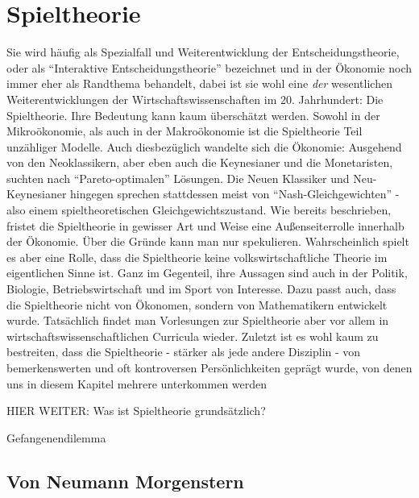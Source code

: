 %
%
%

\chapter{Spieltheorie} \label{cha: Spieltheorie}
\label{Spieltheorie}

Sie wird häufig als Spezialfall und Weiterentwicklung der Entscheidungstheorie, oder als "`Interaktive Entscheidungstheorie"' bezeichnet und in der Ökonomie noch immer eher als Randthema behandelt, dabei ist sie wohl eine \textit{der} wesentlichen Weiterentwicklungen der Wirtschaftswissenschaften im 20. Jahrhundert: Die Spieltheorie. Ihre Bedeutung kann kaum überschätzt werden. Sowohl in der Mikroökonomie, als auch in der Makroökonomie ist die Spieltheorie Teil unzähliger Modelle. Auch diesbezüglich wandelte sich die Ökonomie: Ausgehend von den Neoklassikern, aber eben auch die Keynesianer und die Monetaristen, suchten nach "`Pareto-optimalen"' Lösungen. Die Neuen Klassiker und Neu-Keynesianer hingegen sprechen stattdessen meist von "`Nash-Gleichgewichten"' - also einem spieltheoretischen Gleichgewichtszustand. Wie bereits beschrieben, fristet die Spieltheorie in gewisser Art und Weise eine Außenseiterrolle innerhalb der Ökonomie. Über die Gründe kann man nur spekulieren. Wahrscheinlich spielt es aber eine Rolle, dass die Spieltheorie keine volkswirtschaftliche Theorie im eigentlichen Sinne ist. Ganz im Gegenteil, ihre Aussagen sind auch in der Politik, Biologie,  Betriebswirtschaft und im Sport von Interesse. Dazu passt auch, dass die Spieltheorie nicht von Ökonomen, sondern von Mathematikern entwickelt wurde. Tatsächlich findet man Vorlesungen zur Spieltheorie aber vor allem in wirtschaftswissenschaftlichen Curricula wieder. Zuletzt ist es wohl kaum zu bestreiten, dass die Spieltheorie - stärker als jede andere Disziplin - von bemerkenswerten und oft kontroversen Persönlichkeiten geprägt wurde, von denen uns in diesem Kapitel mehrere unterkommen werden

HIER WEITER: Was ist Spieltheorie grundsätzlich?

Gefangenendilemma







\section{Von Neumann Morgenstern}

